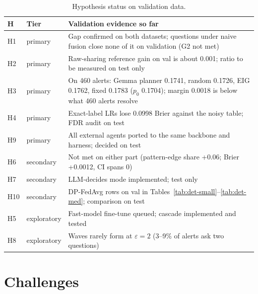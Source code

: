 \documentclass[11pt,a4paper]{article}
\newcommand{\eps}{\varepsilon}
\begin{document}
\begin{table}[!htbp]
\centering\small
\begin{tabularx}{\textwidth}{@{}llL@{}}
\toprule
H & Tier & Validation evidence so far \\
\midrule
H1 & primary & Gap confirmed on both datasets; questions under naive fusion close none of it on validation (G2 not met) \\
H2 & primary & Raw-sharing reference gain on val is about 0.001; ratio to be measured on test only \\
H3 & primary & On 460 alerts: Gemma planner 0.1741, random 0.1726, EIG 0.1762, fixed 0.1783 ($p_0$ 0.1704); margin 0.0018 is below what 460 alerts resolve \\
H4 & primary & Exact-label LRs lose 0.0998 Brier against the noisy table; FDR audit on test \\
H9 & primary & All external agents ported to the same backbone and harness; decided on test \\
H6 & secondary & Not met on either part (pattern-edge share +0.06; Brier +0.0012, CI spans 0) \\
H7 & secondary & LLM-decides mode implemented; test only \\
H10 & secondary & DP-FedAvg rows on val in Tables~\ref{tab:det-small}--\ref{tab:det-med}; comparison on test \\
H5 & exploratory & Fast-model fine-tune queued; cascade implemented and tested \\
H8 & exploratory & Waves rarely form at $\eps = 2$ (3--9\% of alerts ask two questions) \\
\bottomrule
\end{tabularx}
\caption{Hypothesis status on validation data.}
\label{tab:hyp}
\end{table}

\section{Challenges}
\label{sec:challenges}
\end{document}
